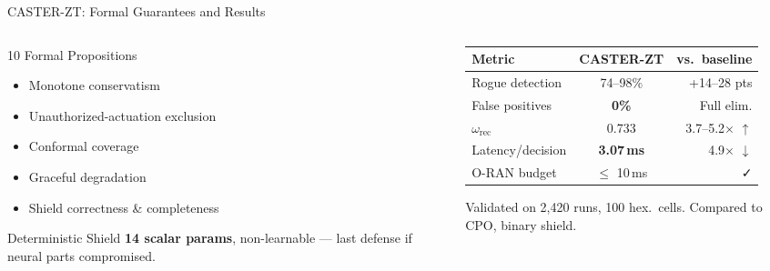 \documentclass[10pt,aspectratio=169]{beamer}
\begin{document}
\begin{frame}[t]{CASTER-ZT: Formal Guarantees and Results}
\begin{columns}[T]
\begin{column}{0.47\textwidth}
  \begin{block}{10 Formal Propositions}
    \begin{itemize}\footnotesize\setlength{\itemsep}{1pt}
      \item Monotone conservatism
      \item Unauthorized-actuation exclusion
      \item Conformal coverage
      \item Graceful degradation
      \item Shield correctness \& completeness
    \end{itemize}
  \end{block}
  \vspace{1pt}
  \begin{alertblock}{Deterministic Shield}
    \footnotesize \textbf{14 scalar params}, non-learnable --- last defense if neural parts compromised.
  \end{alertblock}
\end{column}
\begin{column}{0.47\textwidth}
  \centering\footnotesize
  \renewcommand{\arraystretch}{1.05}
  \begin{tabular}{lcr}
    \toprule
    \textbf{Metric} & \textbf{CASTER-ZT} & \textbf{vs.\ baseline} \\
    \midrule
    Rogue detection & 74--98\% & +14--28 pts \\
    False positives & \textbf{0\%} & Full elim. \\
    $\omega_\text{rec}$ & 0.733 & 3.7--5.2$\times$ $\uparrow$ \\
    Latency/decision & \textbf{3.07\,ms} & 4.9$\times$ $\downarrow$ \\
    O-RAN budget & $\leq$ 10\,ms & \faCheck \\
    \bottomrule
  \end{tabular}
  \vspace{1pt}
  \begin{block}{Validated on}
    \footnotesize 2,420 runs, 100 hex.\ cells. Compared to CPO, binary shield.
  \end{block}
\end{column}
\end{columns}
\end{frame}
\end{document}

